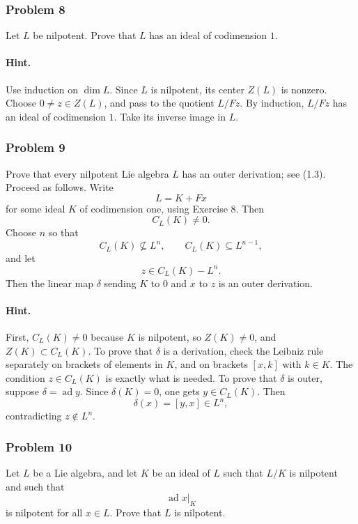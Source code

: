 \documentclass[12pt, a4paper]{article}
\begin{document}
\subsubsection{Problem 8}

Let \(L\) be nilpotent. Prove that \(L\) has an ideal of codimension \(1\).

\paragraph{Hint.}
Use induction on \(\dim L\). Since \(L\) is nilpotent, its center \(Z(L)\) is
nonzero. Choose \(0\neq z\in Z(L)\), and pass to the quotient \(L/Fz\). By
induction, \(L/Fz\) has an ideal of codimension \(1\). Take its inverse image
in \(L\).

\subsubsection{Problem 9}

Prove that every nilpotent Lie algebra \(L\) has an outer derivation; see
(1.3). Proceed as follows. Write
\[
L=K+Fx
\]
for some ideal \(K\) of codimension one, using Exercise 8. Then
\[
C_L(K)\neq 0.
\]
Choose \(n\) so that
\[
C_L(K)\not\subseteq L^n,
\qquad
C_L(K)\subseteq L^{n-1},
\]
and let
\[
z\in C_L(K)-L^n.
\]
Then the linear map \(\delta\) sending \(K\) to \(0\) and \(x\) to \(z\) is an
outer derivation.

\paragraph{Hint.}
First, \(C_L(K)\neq 0\) because \(K\) is nilpotent, so \(Z(K)\neq 0\), and
\(Z(K)\subset C_L(K)\). To prove that \(\delta\) is a derivation, check the
Leibniz rule separately on brackets of elements in \(K\), and on brackets
\([x,k]\) with \(k\in K\). The condition \(z\in C_L(K)\) is exactly what is
needed. To prove that \(\delta\) is outer, suppose \(\delta=\operatorname{ad}y\).
Since \(\delta(K)=0\), one gets \(y\in C_L(K)\). Then
\[
\delta(x)=[y,x]\in L^n,
\]
contradicting \(z\notin L^n\).

\subsubsection{Problem 10}

Let \(L\) be a Lie algebra, and let \(K\) be an ideal of \(L\) such that \(L/K\)
is nilpotent and such that
\[
\operatorname{ad}x|_K
\]
is nilpotent for all \(x\in L\). Prove that \(L\) is nilpotent.
\end{document}
